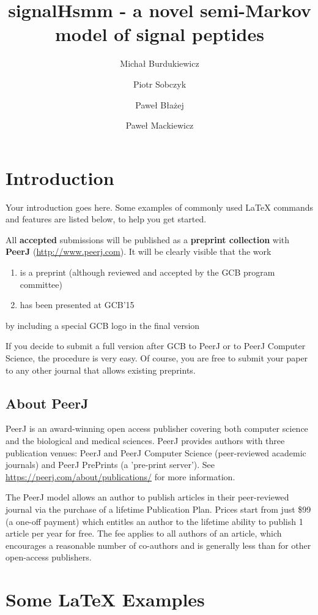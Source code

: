 \documentclass[fleqn,10pt,twoside]{gcb15submission}
\title{signalHsmm - a novel semi-Markov model of signal peptides}
\author[1]{Micha\l{}  Burdukiewicz}
\author[2]{Piotr Sobczyk}
\author[1]{Pawe\l{} B\l{}a\.{z}ej}
\author[1]{Pawe\l{} Mackiewicz}
\affil[1]{University of Wroc\l{}aw, Department of Genomics, Poland}
\affil[2]{Wroc\l{}aw University of Technology, Department of Mathematics, Poland}
\begin{document}
\flushbottom
\maketitle
\thispagestyle{empty}


\section*{Introduction}

Your introduction goes here.
Some examples of commonly used {\LaTeX} commands and features are listed below, to help you get started.

All \textbf{accepted} submissions will be published as a \textbf{preprint collection} with \textbf{PeerJ} (\url{http://www.peerj.com}).
It will be clearly visible that the work
\begin{enumerate}
\item is a preprint (although reviewed and accepted by the GCB program committee)
\item has been presented at GCB'15
\end{enumerate}
by including a special GCB logo in the final version

If you decide to submit a full version after GCB to PeerJ or to PeerJ Computer Science, the procedure is very easy.
Of course, you are free to submit your paper to any other journal that allows existing preprints.


\subsection*{About PeerJ}

PeerJ is an award-winning open access publisher covering both computer science and the biological and medical sciences. 
PeerJ provides authors with three publication venues: PeerJ and PeerJ Computer Science (peer-reviewed academic journals) and PeerJ PrePrints (a 'pre-print server'). See \url{https://peerj.com/about/publications/} for more information.

The PeerJ model allows an author to publish articles in their peer-reviewed journal via the purchase of a lifetime Publication Plan. Prices start from just \$99 (a one-off payment) which entitles an author to the lifetime ability to publish 1 article per year for free.
The fee applies to all authors of an article, which encourages a reasonable number of co-authors and is generally less than for other open-access publishers.


\section*{Some \LaTeX{} Examples}
\label{sec:examples}
\end{document}
